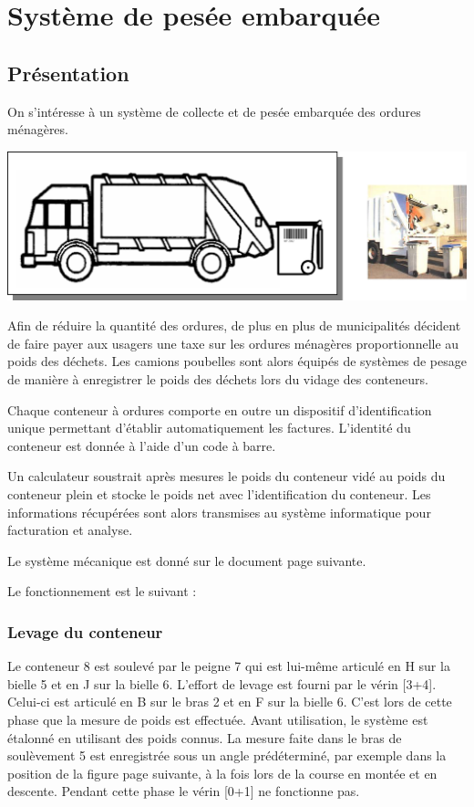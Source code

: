 \documentclass[10pt]{article}
\begin{document}
\newpage
\section*{Système de pesée embarquée}
\setcounter{subparagraph}{0}
\subsection*{Présentation}
On s’intéresse à un système de collecte et de pesée embarquée 
des ordures ménagères. 

\begin{center}
\includegraphics[width=.8\textwidth]{images/fig_03}
\end{center}

Afin de réduire la quantité des ordures, de plus en plus de municipalités décident de faire payer aux usagers 
une taxe sur les ordures ménagères proportionnelle au poids des déchets. Les camions poubelles sont alors 
équipés de systèmes de pesage de manière à enregistrer le poids des déchets lors du vidage des 
conteneurs. 

Chaque conteneur à ordures comporte en outre un dispositif d’identification unique permettant d’établir 
automatiquement les factures. L’identité du conteneur est donnée à l’aide d’un code à barre. 
 
Un calculateur soustrait après mesures le poids du conteneur vidé au poids du conteneur plein et stocke le 
poids net avec l’identification du conteneur. Les informations récupérées sont alors transmises au système 
informatique pour facturation et analyse. 
 
 
Le système mécanique est donné sur le document page suivante. 
 
 
Le fonctionnement est le suivant : 
 
\subsubsection*{Levage du conteneur}
Le conteneur 8 est soulevé par le peigne 7 qui est lui-même articulé en H sur la bielle 5 et en J sur la bielle 
6. L’effort de levage est fourni par le vérin [3+4]. Celui-ci est articulé en B sur le bras 2 et en F sur la bielle 6. 
C’est lors de cette phase que la mesure de poids est effectuée. Avant utilisation, le système est étalonné en 
utilisant des poids connus. La mesure faite dans le bras de soulèvement 5 est enregistrée sous un angle 
prédéterminé, par exemple dans la position de la figure page suivante, à la fois lors de la course en montée 
et en descente. Pendant cette phase le vérin [0+1] ne fonctionne pas. 
 
\end{document}

